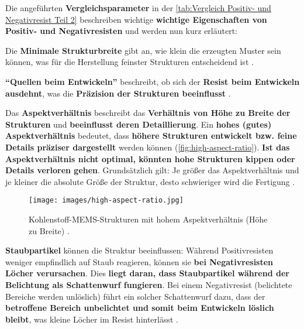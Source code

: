 \documentclass{article} %
\begin{document}
\vspace{1em}

Die angeführten \textbf{Vergleichsparameter} in der \autoref{tab:Vergleich Positiv- und Negativresist Teil 2} beschreiben wichtige \textbf{wichtige Eigenschaften von Positiv- und Negativresisten} und werden nun kurz erläutert: 

\vspace{1em}

Die \textbf{Minimale Strukturbreite} gibt an, wie klein die erzeugten Muster sein können, was für die Herstellung feinster Strukturen entscheidend ist \cite{madou2002, sciencedirect_photoresist}. 

\vspace{1em}

\textbf{``Quellen beim Entwickeln''} beschreibt, ob sich der \textbf{Resist beim Entwickeln ausdehnt}, was die \textbf{Präzision der Strukturen beeinflusst} \cite{hoegel2024}. 

\vspace{1em}

Das \textbf{Aspektverhältnis} beschreibt das \textbf{Verhältnis von Höhe zu Breite der Strukturen} und \textbf{beeinflusst deren Detaillierung}. Ein \textbf{hohes (gutes) Aspektverhältnis} bedeutet, dass \textbf{höhere Strukturen entwickelt bzw. feine Details präziser dargestellt} werden können (\autoref{fig:high-aspect-ratio}). \textbf{Ist das Aspektverhältnis nicht optimal, könnten hohe Strukturen kippen oder Details verloren gehen}. Grundsätzlich gilt: Je größer das Aspektverhältnis und je kleiner die absolute Größe der Struktur, desto schwieriger wird die Fertigung \cite{madou2002, wolf2000, gerald2006, wikipedia_aspektverhaeltnis}.

\begin{figure}[htb!]
    \centering
    \texttt{[image: images/high-aspect-ratio.jpg]} %
    \captionsetup{labelfont=bf, width=.85\textwidth} %
    \caption{Kohlenstoff-MEMS-Strukturen mit hohem Aspektverhältnis (Höhe zu Breite) \cite{carbonMEMS}.}
    \label{fig:high-aspect-ratio}
\end{figure}

\vspace{1em}

\textbf{Staubpartikel} können die Struktur beeinflussen: Während Positivresisten weniger empfindlich auf Staub reagieren, können sie \textbf{bei Negativresisten Löcher verursachen}. Dies \textbf{liegt daran, dass Staubpartikel während der Belichtung als Schattenwurf fungieren}. Bei einem Negativresist (belichtete Bereiche werden unlöslich) führt ein solcher Schattenwurf dazu, dass der \textbf{betroffene Bereich unbelichtet und somit beim Entwickeln löslich bleibt}, was kleine Löcher im Resist hinterlässt \cite{madou2002, sciencedirect_photoresist}.
\end{document}
